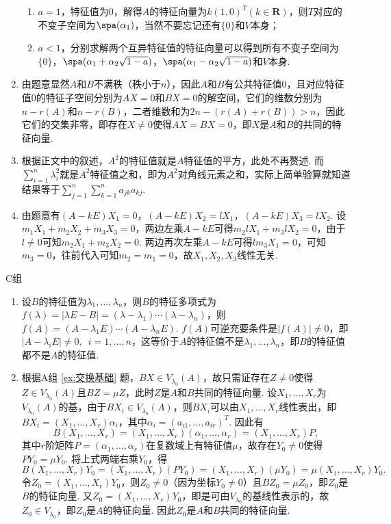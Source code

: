 \begin{enumerate}
\begin{enumerate}
              \item $a=1$，特征值为0，解得$A$的特征向量为$k(1,0)^T(k\in\mathbf{R})$，则$T$对应的不变子空间为$\spa(\alpha_1)$，当然不要忘记还有$\{0\}$和$V$本身；

              \item $a<1$，分别求解两个互异特征值的特征向量可以得到所有不变子空间为$\{0\}$，$\spa(\alpha_1+\alpha_2\sqrt{1-a})$，$\spa(\alpha_1-\alpha_2\sqrt{1-a})$和$V$本身.
          \end{enumerate}

    \item 由题意显然$A$和$B$不满秩（秩小于$n$），因此$A$和$B$有公共特征值0，且对应特征值0的特征子空间分别为$AX=0$和$BX=0$的解空间，它们的维数分别为$n-r(A)$和$n-r(B)$，二者维数和为$2n-(r(A)+r(B))>n$，因此它们的交集非零，即存在$X\neq 0$使得$AX=BX=0$，即$X$是$A$和$B$的共同的特征向量.

    \item 根据正文中的叙述，$A^2$的特征值就是$A$特征值的平方，此处不再赘述. 而$\displaystyle\sum_{i=1}^{n}\lambda_i^2$就是$A^2$特征值之和，即为$A^2$对角线元素之和，实际上简单验算就知道结果等于$\displaystyle\sum_{j=1}^{n}\displaystyle\sum_{k=1}^{n}a_{jk}a_{kj}$.

    \item 由题意有$(A-kE)X_1=0$，$(A-kE)X_2=lX_1$，$(A-kE)X_3=lX_2$. 设$m_1X_1+m_2X_2+m_3X_3=0$，两边左乘$A-kE$可得$m_2lX_1+m_3lX_2=0$，由于$l\neq 0$可知$m_2X_1+m_3X_2=0$. 两边再次左乘$A-kE$可得$lm_3X_1=0$，可知$m_3=0$，往前代入可知$m_2=m_1=0$，故$X_1,X_2,X_3$线性无关.
\end{enumerate}

\centerline{\heiti C组}
\begin{enumerate}
    \item 设$B$的特征值为$\lambda_1,\ldots,\lambda_n$，则$B$的特征多项式为$f(\lambda)=|\lambda E-B|=(\lambda-\lambda_1)\cdots(\lambda-\lambda_n)$，则$f(A)=(A-\lambda_1E)\cdots(A-\lambda_nE)$. $f(A)$可逆充要条件是$|f(A)|\neq 0$，即$|A-\lambda_iE|\neq 0,\enspace i=1,\ldots,n$，这等价于$A$的特征值不是$\lambda_1,\ldots,\lambda_n$，即$B$的特征值都不是$A$的特征值.

    \item 根据A组 \ref*{ex:交换基础} 题，$BX\in V_{\lambda_0}(A)$，故只需证存在$Z\neq 0$使得$Z\in V_{\lambda_0}(A)$且$BZ=\mu Z$，此时$Z$是$A$和$B$共同的特征向量. 设$X_1,\ldots,X_r$为$V_{\lambda_0}(A)$的基，由于$BX_i\in V_{\lambda_0}(A)$，则$BX_i$可以由$X_1,\ldots,X_r$线性表出，即$BX_i=(X_1,\ldots,X_r)\alpha_i$，其中$\alpha_i=(a_{i1},\ldots,a_{ir})^T$. 因此有
          \[B(X_1,\ldots,X_r)=(X_1,\ldots,X_r)(\alpha_1,\ldots,\alpha_r)=(X_1,\ldots,X_r)P,\]
          其中$r$阶矩阵$P=(\alpha_1,\ldots,\alpha_r)$在复数域上有特征值$\mu$，故存在$Y_0\neq 0$使得$PY_0=\mu Y_0$. 将上式两端右乘$Y_0$，得
          \[B(X_1,\ldots,X_r)Y_0=(X_1,\ldots,X_r)(PY_0)=(X_1,\ldots,X_r)(\mu Y_0)=\mu(X_1,\ldots,X_r)Y_0.\]
          令$Z_0=(X_1,\ldots,X_r)Y_0$，则$Z_0\neq 0$（因为坐标$Y_0\neq 0$）且$BZ_0=\mu Z_0$，即$Z_0$是$B$的特征向量. 又$Z_0=(X_1,\ldots,X_r)Y_0$，即是可由$V_{\lambda_0}$的基线性表示的，故$Z_0\in V_{\lambda_0}$，即$Z_0$是$A$的特征向量. 因此$Z_0$是$A$和$B$共同的特征向量.
\end{enumerate}

\clearpage
